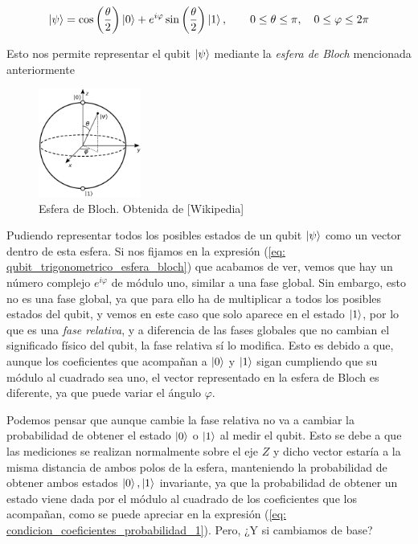 \documentclass{article}
\numberwithin{equation}{section} %
\begin{document}
    \begin{equation}
        \ket{\psi} = \cos \left( \frac{\theta}{2} \right) \ket{0} + e^{i \varphi} \sin \left( \frac{\theta}{2} \right) \ket{1}, \qquad 0 \leq \theta \leq \pi, \quad 0 \leq \varphi \leq 2 \pi
        \label{eq: qubit_trigonometrico_esfera_bloch}
    \end{equation}

    \vspace{2.5mm}

    Esto nos permite representar el qubit \( \ket{\psi} \) mediante la \textit{esfera de Bloch} mencionada anteriormente

    \begin{figure}[H]
        \centering
        \includegraphics[width=0.3\textwidth]{img/Bloch/bloch_sphere.png}
        \caption{Esfera de Bloch. Obtenida de [Wikipedia]}\label{fig: bloch_sphere}
    \end{figure}

    Pudiendo representar todos los posibles estados de un qubit \( \ket{\psi} \) como un vector dentro de esta esfera. 
    Si nos fijamos en la expresión (\ref{eq: qubit_trigonometrico_esfera_bloch}) que acabamos de ver, vemos que hay un número complejo \( e^{i \varphi} \) de módulo uno, similar a una fase global. Sin embargo, esto no es una fase global, ya que para ello ha de multiplicar a todos los posibles estados del qubit, y vemos en este caso que solo aparece en el estado \( \ket{1} \), por lo que es una \textit{fase relativa}, y a diferencia de las fases globales que no cambian el significado físico del qubit, la fase relativa sí lo modifica. Esto es debido a que, aunque los coeficientes que acompañan a \( \ket{0} \) y \( \ket{1} \) sigan cumpliendo que su módulo al cuadrado sea uno, el vector representado en la esfera de Bloch es diferente, ya que puede variar el ángulo \( \varphi \).

    \vspace{5mm}

    Podemos pensar que aunque cambie la fase relativa no va a cambiar la probabilidad de obtener el estado \( \ket{0} \) o \( \ket{1} \) al medir el qubit. Esto se debe a que las mediciones se realizan normalmente sobre el eje \( Z \) y dicho vector estaría a la misma distancia de ambos polos de la esfera, manteniendo la probabilidad de obtener ambos estados \( \ket{0}, \ket{1} \) invariante, ya que la probabilidad de obtener un estado viene dada por el módulo al cuadrado de los coeficientes que los acompañan, como se puede apreciar en la expresión (\ref{eq: condicion_coeficientes_probabilidad_1}). Pero, ¿Y si cambiamos de base?
    
\end{document}
